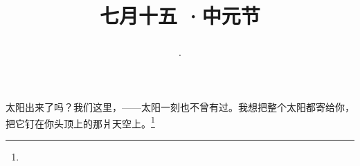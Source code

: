 \title{\date[d=18,m=8,y=2024][year:cn-y,年,month:cn,day:cn,日,·,weekday]·七月十五 ·中元节}
太阳出来了吗？我们这里，——太阳一刻也不曾有过。我想把整个太阳都寄给你，把它钉在你头顶上的那爿天空上。\footnote{ }

